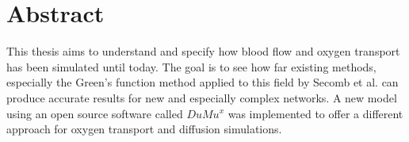 \section*{Abstract}


This thesis aims to understand and specify how blood flow and oxygen transport has been simulated until today. The goal is to see how far existing methods, especially the Green's function method applied to this field by Secomb et al. \cite{Secomb2004} can produce accurate results for new and especially complex networks. A new model using an open source software called $DuMu^x$ \cite{flemischdumux} was implemented to offer a different approach for oxygen transport and diffusion simulations.\\